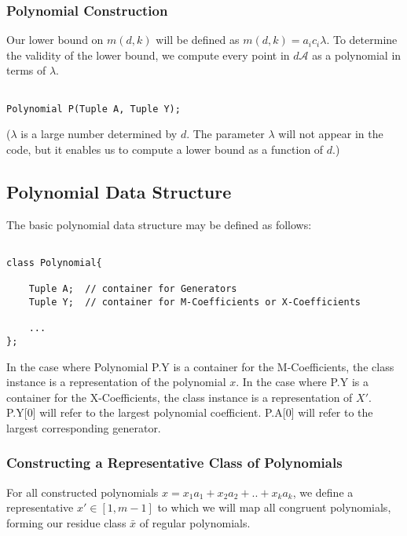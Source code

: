 \subsubsection{Polynomial Construction}

Our lower bound on $m(d, k)$ will be defined as $m(d, k) = a_{i}c_{i} \lambda$. To determine the validity of the lower bound, we compute every point in $d \mathcal{A}$ as a polynomial in terms of $\lambda$.\n

\begin{lstlisting}

Polynomial P(Tuple A, Tuple Y);

\end{lstlisting}

\noindent
($\lambda$ is a large number determined by $d$. The parameter $\lambda$ will not appear in the code, but it enables us to compute a lower bound as a function of $d$.)\n

\subsection*{Polynomial Data Structure} The basic polynomial data structure may be defined as follows:

\begin{lstlisting}

class Polynomial{

    Tuple A;  // container for Generators
    Tuple Y;  // container for M-Coefficients or X-Coefficients

    ...
};

\end{lstlisting}

In the case where Polynomial P.Y is a container for the M-Coefficients, the class instance is a representation of the polynomial $x$. In the case where P.Y is a container for the X-Coefficients, the class instance is a representation of $X'$.
P.Y[0] will refer to the largest polynomial coefficient. P.A[0] will refer to the largest corresponding generator.

\subsubsection{Constructing a Representative Class of Polynomials}

For all constructed polynomials $x = x_1a_{1} + x_2a_{2} + .. + x_{k}a_{k}$, we define a representative $x' \in [1, m-1]$ to which we will map all congruent polynomials, forming our residue class $\bar{x}$ of regular polynomials.\n

